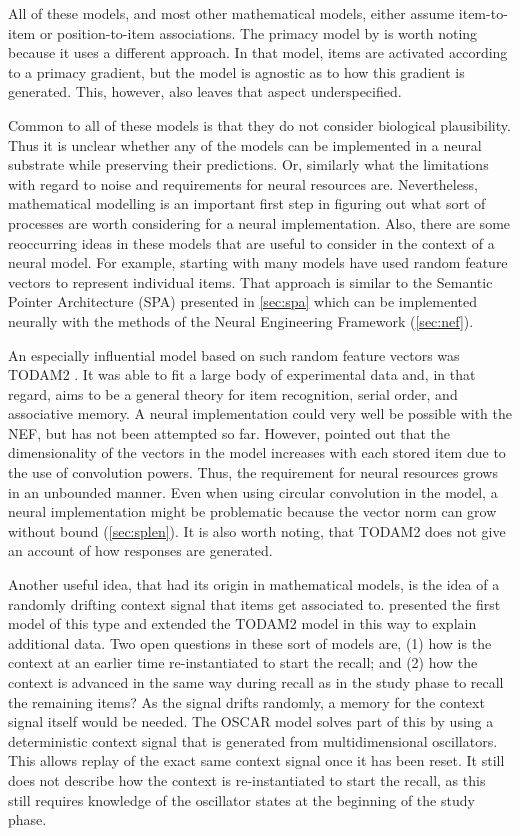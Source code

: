 All of these models, and most other mathematical models, either assume item-to-item or position-to-item associations.
The primacy model by \textcite{Page1998} is worth noting because it uses a different approach.
In that model, items are activated according to a primacy gradient, but the model is agnostic as to how this gradient is generated.
This, however, also leaves that aspect underspecified.

Common to all of these models is that they do not consider biological plausibility.
Thus it is unclear whether any of the models can be implemented in a neural substrate while preserving their predictions.
Or, similarly what the limitations with regard to noise and requirements for neural resources are.
Nevertheless, mathematical modelling is an important first step in figuring out what sort of processes are worth considering for a neural implementation.
Also, there are some reoccurring ideas in these models that are useful to consider in the context of a neural model.
For example, starting with \textcite{Anderson1973} many models have used random feature vectors to represent individual items.
That approach is similar to the Semantic Pointer Architecture (SPA) presented in \cref{sec:spa} which can be implemented neurally with the methods of the Neural Engineering Framework (\cref{sec:nef}).

An especially influential model based on such random feature vectors was \mbox{TODAM2} \parencite{Murdock1993}.
It was able to fit a large body of experimental data and, in that regard, aims to be a general theory for item recognition, serial order, and associative memory.
A neural implementation could very well be possible with the NEF, but has not been attempted so far.
However, \textcite{Choo2010} pointed out that the dimensionality of the vectors in the model increases with each stored item due to the use of convolution powers.
Thus, the requirement for neural resources grows in an unbounded manner.
Even when using circular convolution in the model, a neural implementation might be problematic because the vector norm can grow without bound (\cref{sec:splen}).
It is also worth noting, that \mbox{TODAM2} does not give an account of how responses are generated.

Another useful idea, that had its origin in mathematical models, is the idea of a randomly drifting context signal that items get associated to.
\Textcite{Estes1955} presented the first model of this type and \textcite{Murdock1997} extended the \mbox{TODAM2} model in this way to explain additional data.
Two open questions in these sort of models are, (1) how is the context at an earlier time re-instantiated to start the recall;
and (2) how the context is advanced in the same way during recall as in the study phase to recall the remaining items?
As the signal drifts randomly, a memory for the context signal itself would be needed.
The OSCAR model \parencite{Brown2000} solves part of this by using a deterministic context signal that is generated from multidimensional oscillators.
This allows replay of the exact same context signal once it has been reset.
It still does not describe how the context is re-instantiated to start the recall, as this still requires knowledge of the oscillator states at the beginning of the study phase.

